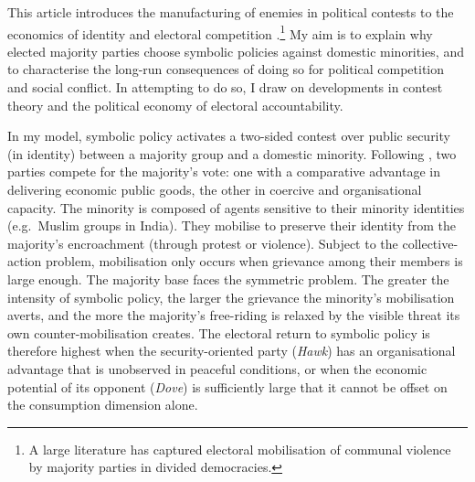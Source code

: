 \documentclass[11pt,twoside]{extarticle}
\begin{document}

This article introduces the manufacturing of enemies in political contests to the economics of identity and electoral competition \citep*{shayoModelSocialIdentity2009,glaeserPoliticalEconomyHatred2005,gennaioliIdentityPolitics2023}.\footnote{A large literature has captured electoral mobilisation of communal violence by majority parties in divided democracies.} My aim is to explain why elected majority parties choose symbolic policies against domestic minorities, and to characterise the long-run consequences of doing so for political competition and social conflict. In attempting to do so, I draw on developments in contest theory and the political economy of electoral accountability.


In my model, symbolic policy activates a two-sided contest over public security (in identity) between a majority group and a domestic minority. Following \citet*{baligaStrategyManipulatingConflict2012}, two parties compete for the majority's vote: one with a comparative advantage in delivering economic public goods, the other in coercive and organisational capacity. The minority is composed of agents sensitive to their minority identities (e.g.\ Muslim groups in India). They mobilise to preserve their identity from the majority's encroachment (through protest or violence). Subject to the collective-action problem, mobilisation only occurs when grievance among their members is large enough. The majority base faces the symmetric problem. The greater the intensity of symbolic policy, the larger the grievance the minority's mobilisation averts, and the more the majority's free-riding is relaxed by the visible threat its own counter-mobilisation creates. The electoral return to symbolic policy is therefore highest when the security-oriented party (\emph{Hawk}) has an organisational advantage that is unobserved in peaceful conditions, or when the economic potential of its opponent (\emph{Dove}) is sufficiently large that it cannot be offset on the consumption dimension alone.

\end{document}

